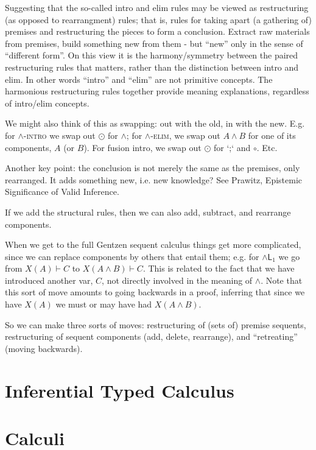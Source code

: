 \documentclass{article}
\begin{document}
\begin{remark}
  Suggesting that the so-called intro and elim rules may be viewed as
  restructuring (as opposed to rearrangment) rules; that is, rules for
  taking apart (a gathering of) premises and restructuring the pieces
  to form a conclusion.  Extract raw materials from premises, build
  something new from them - but ``new'' only in the sense of
  ``different form''.  On this view it is the harmony/symmetry between
  the paired restructuring rules that matters, rather than the
  distinction between intro and elim.  In other words ``intro'' and
  ``elim'' are not primitive concepts.  The harmonious restructuring
  rules together provide meaning explanations, regardless of
  intro/elim concepts.
\end{remark}

We might also think of this as swapping: out with the old, in with the
new.  E.g. for \(\land\)-\textsc{intro} we swap out \(\odot\) for
\(\land\); for \(\land\)-\textsc{elim}, we swap out \(A\land B\) for
one of its components, \(A\) (or \(B\)).  For fusion intro, we swap
out \(\odot\) for `;` and \(\circ\).  Etc.

Another key point: the conclusion is not merely the same as the
premises, only rearranged.  It adds something new, i.e. new knowledge?
See Prawitz, Epistemic Significance of Valid Inference.

If we add the structural rules, then we can also add, subtract, and
rearrange components.

When we get to the full Gentzen sequent calculus things get more
complicated, since we can replace components by others that entail
them; e.g. for \(\land\textsf{L}_1\) we go from \(X(A)\vdash C\) to
\(X(A\land B)\vdash C\).  This is related to the fact that we have
introduced another var, \(C\), not directly involved in the meaning of
\(\land\).  Note that this sort of move amounts to going backwards in
a proof, inferring that since we have \(X(A)\) we must or may have had
\(X(A\land B)\).

So we can make three sorts of moves: restructuring of (sets of)
premise sequents, restructuring of sequent components (add, delete,
rearrange), and ``retreating'' (moving backwards).

\section{Inferential Typed Calculus}

\section{Calculi}
\end{document}
